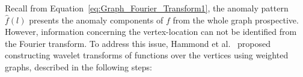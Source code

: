 
Recall from Equation~\ref{eq:Graph_Fourier_Transform1}, the anomaly pattern $\hat{f}(l)$ presents the anomaly components of $f$ from the whole graph prospective. However, information concerning the vertex-location can not be identified from the Fourier transform. To address this issue, Hammond et al.~\cite{hammond2011wavelets} proposed constructing wavelet transforms of functions over the vertices using weighted graphs, described in the following steps:

